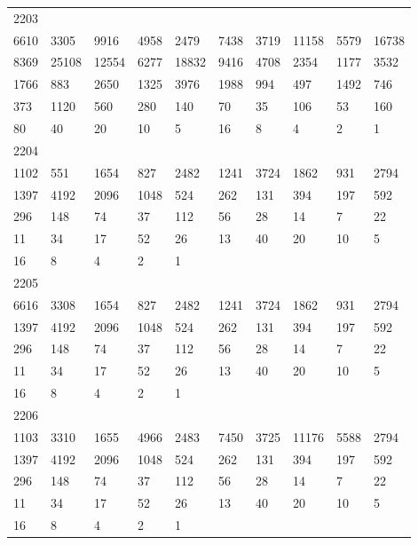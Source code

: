 \begin{longtable}{*{10}{l}}
2203&&&&&&&&&\\
6610& 3305& 9916& 4958& 2479& 7438& 3719& 11158& 5579& 16738\\
8369& 25108& 12554& 6277& 18832& 9416& 4708& 2354& 1177& 3532\\
1766& 883& 2650& 1325& 3976& 1988& 994& 497& 1492& 746\\
373& 1120& 560& 280& 140& 70& 35& 106& 53& 160\\
80& 40& 20& 10& 5& 16& 8& 4& 2& 1\\

2204&&&&&&&&&\\
1102& 551& 1654& 827& 2482& 1241& 3724& 1862& 931& 2794\\
1397& 4192& 2096& 1048& 524& 262& 131& 394& 197& 592\\
296& 148& 74& 37& 112& 56& 28& 14& 7& 22\\
11& 34& 17& 52& 26& 13& 40& 20& 10& 5\\
16& 8& 4& 2& 1& \\

2205&&&&&&&&&\\
6616& 3308& 1654& 827& 2482& 1241& 3724& 1862& 931& 2794\\
1397& 4192& 2096& 1048& 524& 262& 131& 394& 197& 592\\
296& 148& 74& 37& 112& 56& 28& 14& 7& 22\\
11& 34& 17& 52& 26& 13& 40& 20& 10& 5\\
16& 8& 4& 2& 1& \\

2206&&&&&&&&&\\
1103& 3310& 1655& 4966& 2483& 7450& 3725& 11176& 5588& 2794\\
1397& 4192& 2096& 1048& 524& 262& 131& 394& 197& 592\\
296& 148& 74& 37& 112& 56& 28& 14& 7& 22\\
11& 34& 17& 52& 26& 13& 40& 20& 10& 5\\
16& 8& 4& 2& 1& \\


\end{longtable}
